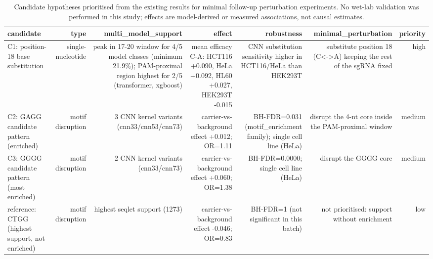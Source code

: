 \begin{table}[htbp]
\centering
\footnotesize
\caption{Candidate hypotheses prioritised from the existing results for minimal follow-up perturbation experiments. No wet-lab validation was performed in this study; effects are model-derived or measured associations, not causal estimates.}
\label{tab:candidates}
\begin{tabular}{lrrrrrr}
\toprule
candidate & type & multi\_model\_support & effect & robustness & minimal\_perturbation & priority \\
\midrule
C1: position-18 base substitution & single-nucleotide & peak in 17-20 window for 4/5 model classes (minimum 21.9\%); PAM-proximal region highest for 2/5 (transformer, xgboost) & mean efficacy C-A: HCT116 +0.090, HeLa +0.092, HL60 +0.027, HEK293T -0.015 & CNN substitution sensitivity higher in HCT116/HeLa than HEK293T & substitute position 18 (C<->A) keeping the rest of the sgRNA fixed & high \\
C2: GAGG candidate pattern (enriched) & motif disruption & 3 CNN kernel variants (cnn33/cnn53/cnn73) & carrier-vs-background effect +0.012; OR=1.11 & BH-FDR=0.031 (motif\_enrichment family); single cell line (HeLa) & disrupt the 4-nt core inside the PAM-proximal window & medium \\
C3: GGGG candidate pattern (most enriched) & motif disruption & 2 CNN kernel variants (cnn33/cnn73) & carrier-vs-background effect +0.060; OR=1.38 & BH-FDR=0.0000; single cell line (HeLa) & disrupt the GGGG core & medium \\
reference: CTGG (highest support, not enriched) & motif disruption & highest seqlet support (1273) & carrier-vs-background effect -0.046; OR=0.83 & BH-FDR=1 (not significant in this batch) & not prioritised: support without enrichment & low \\
\bottomrule
\end{tabular}
\end{table}

